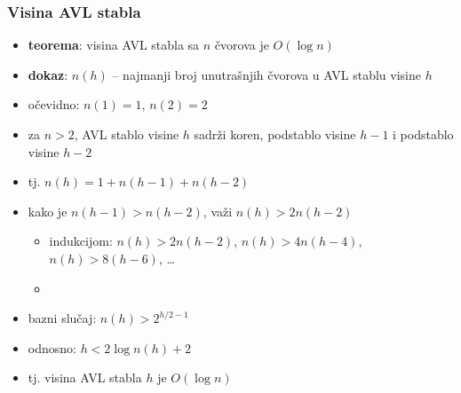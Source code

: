 \documentclass[compress]{beamer}
\begin{document}
\begin{frame}[fragile]
  \frametitle{Visina AVL stabla}
  \begin{itemize}
    \item \textbf{teorema}: visina AVL stabla sa $n$ čvorova je $O(\log n)$
    \item \textbf{dokaz}: $n(h)$ -- najmanji broj unutrašnjih čvorova u AVL stablu visine $h$
    \item očevidno: $n(1)=1$, $n(2)=2$
    \item za $n>2$, AVL stablo visine $h$ sadrži koren, podstablo visine $h-1$ i podstablo visine $h-2$
    \item tj. $n(h) = 1 + n(h-1) + n(h-2)$
    \item kako je $n(h-1)>n(h-2)$, važi $n(h)>2n(h-2)$
    \begin{itemize}
      \item indukcijom: $n(h)>2n(h-2)$, $n(h)>4n(h-4)$, $n(h)>8(h-6)$, \ldots
      \item {}
    \end{itemize}
    \item bazni slučaj: $n(h)>2^{h/2-1}$
    \item odnosno: $h < 2\log n(h) + 2$
    \item tj. visina AVL stabla $h$ je $O(\log n)$
  \end{itemize}
\end{frame}
\end{document}
